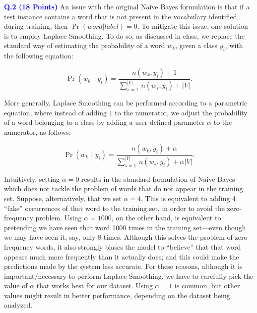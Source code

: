 \documentclass[letterpaper]{article}
\newcommand{\HIGHLIGHT}[1]{\textcolor{blue}{\textbf{#1}}}
\begin{document}
\noindent \HIGHLIGHT{Q.2 (18 Points)} An issue with the original Naive Bayes formulation is that if a test instance contains a word that is not present in the vocabulary identified during training, then  $\Pr(word|label)=0$. To mitigate this issue, one solution is to employ Laplace Smoothing. To do so, as discussed in class, we replace the standard way of estimating the probability of a word $w_k$, given a class $y_i$, with the following equation:

\begin{equation}
    \Pr\left(w_k\,\,|\,\,y_i\right) = \frac{n(w_k, y_i) + 1}{\sum_{s=1}^{|V|} \, n(w_s, y_i) + |V|}.
\end{equation}

More generally, Laplace Smoothing can be performed according to a parametric equation, where instead of adding $1$ to the numerator, we adjust the probability of a word belonging to a class by adding a user-defined parameter $\alpha$ to the numerator, as follows:

\begin{equation}
    \Pr\left(w_k\,\,|\,\,y_i\right) = \frac{n(w_k, y_i) + \alpha}{\sum_{s=1}^{|V|} \, n(w_s, y_i) + \alpha |V|}.
\end{equation}

Intuitively, setting $\alpha = 0$ results in the standard formulation of Naive Bayes---which does not tackle the problem of words that do not appear in the training set. Suppose, alternatively, that we set $\alpha=4$. This is equivalent to adding 4 ``fake'' occurrences of that word to the training set, in order to avoid the zero-frequency problem. Using $\alpha=1000$, on the other hand, is equivalent to pretending we have seen that word 1000 times in the training set---even though we may have seen it, say, only 8 times. Although this solves the problem of zero-frequency words, it also strongly biases the model to ``believe'' that that word appears much more frequently than it actually does; and this could make the predictions made by the system less accurate. For these reasons, although it is important/necessary to perform Laplace Smoothing, we have to carefully pick the value of $\alpha$ that works best for our dataset. Using $\alpha=1$ is common, but other values might result in better performance, depending on the dataset being analyzed.
\end{document}
